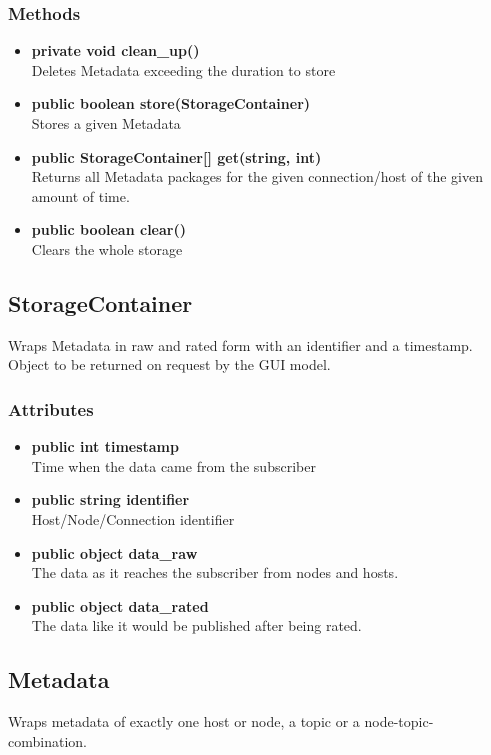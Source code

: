 \subsubsection{Methods}
\begin{itemize}
	\item \textbf{private void clean\_up()}\\
	Deletes Metadata exceeding the duration to store
	\item \textbf{public boolean store(StorageContainer)}\\
	Stores a given Metadata
	\item \textbf{public StorageContainer[] get(string, int)}\\
	Returns all Metadata packages for the given connection/host of the given amount of time.
	\item \textbf{public boolean clear()}\\
	Clears the whole storage
\end{itemize}


\subsection{StorageContainer}
Wraps Metadata in raw and rated form with an identifier and a timestamp. Object to be returned on request by the GUI model.

\subsubsection{Attributes}
\begin{itemize}
	\item \textbf{public int timestamp}\\
	Time when the data came from the subscriber
	\item \textbf{public string identifier}\\
	Host/Node/Connection identifier
	\item \textbf{public object data\_raw}\\
	The data as it reaches the subscriber from nodes and hosts.
	\item \textbf{public object data\_rated}\\
	The data like it would be published after being rated.
\end{itemize}


\subsection{Metadata}
Wraps metadata of exactly one host or node, a topic or a node-topic-combination.

